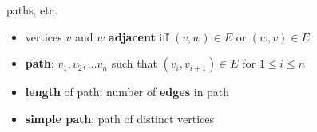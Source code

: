 \begin{frame}{paths, etc.}
\begin{itemize}
\item vertices $v$ and $w$ \textbf{adjacent} iff $(v,w) \in E$ or $(w,v) \in E$
\item \textbf{path}: $v_1, v_2, \ldots v_n$ such that $(v_i, v_{i+1}) \in E$ for $1 \le i \le n$
\item \textbf{length} of path: number of \textbf{edges} in path
\item \textbf{simple path}: path of distinct vertices
\end{itemize}
\end{frame}
